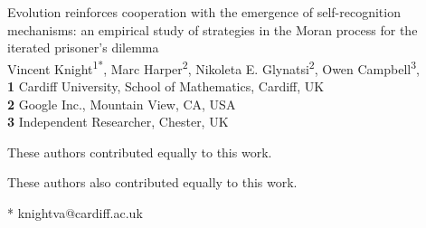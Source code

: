 \documentclass[10pt,letterpaper]{article}
\date{}
\begin{document}
\vspace*{0.2in}

\begin{flushleft}
{\Large
\textbf\newline
{Evolution reinforces cooperation with the emergence of self-recognition
 mechanisms: an empirical study of strategies in the Moran process for the
 iterated prisoner's dilemma }
}
\newline
\\
Vincent Knight\textsuperscript{1*\Yinyang},
Marc Harper\textsuperscript{2\Yinyang},
Nikoleta E. Glynatsi\textsuperscript{2\ddag},
Owen Campbell\textsuperscript{3\ddag},
\\
\bigskip
\textbf{1} Cardiff University, School of Mathematics, Cardiff, UK
\\
\textbf{2} Google Inc., Mountain View, CA, USA
\\
\textbf{3} Independent Researcher, Chester, UK
\\
\bigskip

%
%
\Yinyang These authors contributed equally to this work.

\ddag These authors also contributed equally to this work.


* knightva@cardiff.ac.uk

\end{flushleft}
\end{document}
